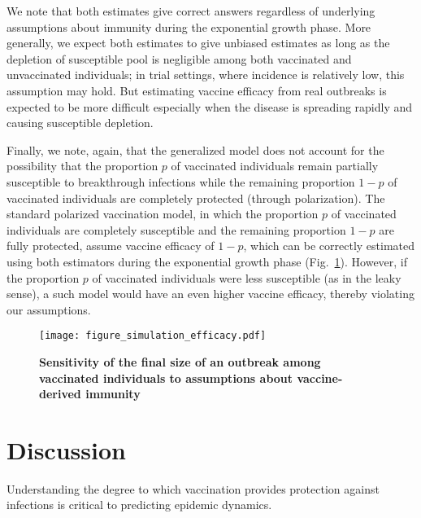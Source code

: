 \documentclass[12pt]{article}
\newcommand{\fref}[1]{Fig.~\ref{fig:#1}}
\begin{document}
We note that both estimates give correct answers regardless of underlying assumptions about immunity during the exponential growth phase.
More generally, we expect both estimates to give unbiased estimates as long as the depletion of susceptible pool is negligible among both vaccinated and unvaccinated individuals;
in trial settings, where incidence is relatively low, this assumption may hold.
But estimating vaccine efficacy from real outbreaks is expected to be more difficult especially when the disease is spreading rapidly and causing susceptible depletion.

Finally, we note, again, that the generalized model does not account for the possibility that the proportion $p$ of vaccinated individuals remain partially susceptible to breakthrough infections while the remaining proportion $1-p$ of vaccinated individuals are completely protected (through polarization).
The standard polarized vaccination model, in which the proportion $p$ of vaccinated individuals are completely susceptible and the remaining proportion $1-p$ are fully protected, assume vaccine efficacy of $1-p$, which can be correctly estimated using both estimators during the exponential growth phase (\fref{efficacy}).
However, if the proportion $p$ of vaccinated individuals were less susceptible (as in the leaky sense), a such model would have an even higher vaccine efficacy, thereby violating our assumptions.

\begin{figure}[!th]
\texttt{[image: figure\_simulation\_efficacy.pdf]}
\caption{
\textbf{Sensitivity of the final size of an outbreak among vaccinated individuals to assumptions about vaccine-derived immunity}
\label{fig:efficacy}
}
\end{figure}

\section*{Discussion}

Understanding the degree to which vaccination provides protection against infections is critical to predicting epidemic dynamics.



\end{document}

